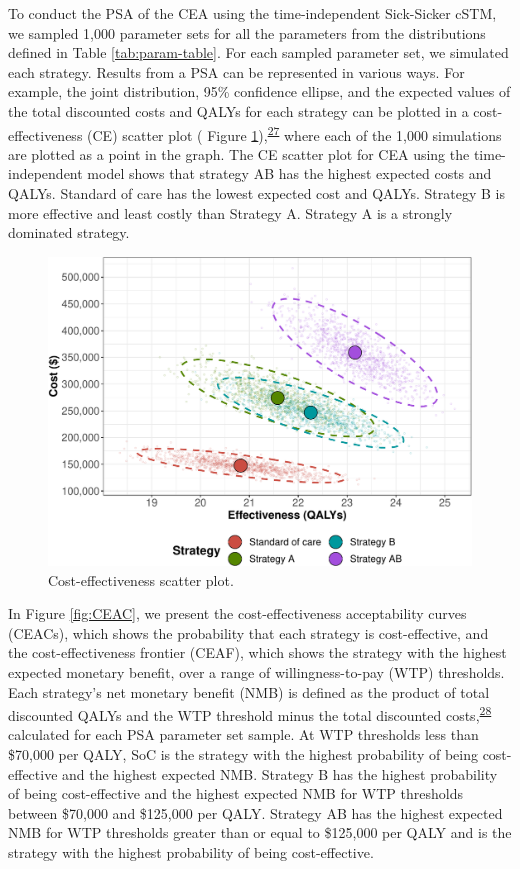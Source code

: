 \documentclass[
]{article}
\begin{document}
To conduct the PSA of the CEA using the time-independent Sick-Sicker cSTM, we sampled 1,000 parameter sets for all the parameters from the distributions defined in Table \ref{tab:param-table}. For each sampled parameter set, we simulated each strategy. Results from a PSA can be represented in various ways. For example, the joint distribution, 95\% confidence ellipse, and the expected values of the total discounted costs and QALYs for each strategy can be plotted in a cost-effectiveness (CE) scatter plot ( Figure \ref{fig:CE-scatter}),\textsuperscript{\protect\hyperlink{ref-Briggs2002}{27}} where each of the 1,000 simulations are plotted as a point in the graph. The CE scatter plot for CEA using the time-independent model shows that strategy AB has the highest expected costs and QALYs. Standard of care has the lowest expected cost and QALYs. Strategy B is more effective and least costly than Strategy A. Strategy A is a strongly dominated strategy.

\begin{figure}[H]

{\centering \includegraphics{figs/CE-scatter-1} 

}

\caption{Cost-effectiveness scatter plot.}\label{fig:CE-scatter}
\end{figure}

In Figure \ref{fig:CEAC}, we present the cost-effectiveness acceptability curves (CEACs), which shows the probability that each strategy is cost-effective, and the cost-effectiveness frontier (CEAF), which shows the strategy with the highest expected monetary benefit, over a range of willingness-to-pay (WTP) thresholds. Each strategy's net monetary benefit (NMB) is defined as the product of total discounted QALYs and the WTP threshold minus the total discounted costs,\textsuperscript{\protect\hyperlink{ref-Stinnett1998b}{28}} calculated for each PSA parameter set sample. At WTP thresholds less than \$70,000 per QALY, SoC is the strategy with the highest probability of being cost-effective and the highest expected NMB. Strategy B has the highest probability of being cost-effective and the highest expected NMB for WTP thresholds between \$70,000 and \$125,000 per QALY. Strategy AB has the highest expected NMB for WTP thresholds greater than or equal to \$125,000 per QALY and is the strategy with the highest probability of being cost-effective.
\end{document}
